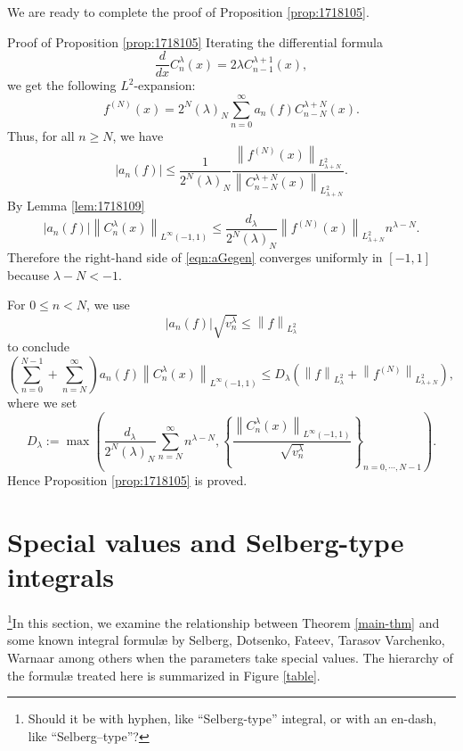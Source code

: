 \documentclass[12pt]{article}
\newcommand{\myabs}[1]{\left|#1\right|}
\numberwithin{equation}{section}
\newcommand{\mynorm}[1]{\left\|#1\right\|}
\newenvironment{proof*}[1]{\noindent{\textit{#1.\ }}}{\hspace*{\fill}$\Box$\medskip}
\newcommand{\mygrammarfootnote}[1]{}
\begin{document}
We are ready to complete the proof of Proposition \ref{prop:1718105}.

\begin{proof*}{Proof of Proposition \ref{prop:1718105}}
	Iterating the differential formula\begin{equation*}
		\frac{d}{dx}C_n^\lambda(x)=2\lambda C^{\lambda+1}_{n-1}(x),
	\end{equation*}we {get} the following $L^2$-expansion:\begin{equation*}
		f^{(N)}(x)=2^N(\lambda)_N\displaystyle\sum_{n=0}^\infty a_n(f)C_{n-N}^{\lambda+N}(x).
	\end{equation*}Thus, for all $n\ge N$, we have\begin{equation*}
		\myabs{a_n(f)}\le\frac{1}{2^N(\lambda)_N}\frac{\mynorm{f^{(N)}(x)}_{L^2_{\lambda+N}}}{\mynorm{C^{\lambda+N}_{n-N}(x)}_{L^2_{\lambda+N}}}.
	\end{equation*}By Lemma \ref{lem:1718109}\begin{equation*}
		\myabs{a_n(f)}\mynorm{C^\lambda_n(x)}_{L^\infty(-1,1)}\le\frac{d_\lambda}{2^N(\lambda)_N}\mynorm{f^{(N)}(x)}_{L^2_{\lambda+N}}n^{\lambda-N}.
	\end{equation*}Therefore\mygrammarfootnote{comma here?} the right-hand side of \eqref{eqn:aGegen} converges uniformly in $[-1,1]$ because $\lambda-N<-1$.

	For $0\le n<N$, we use\begin{equation*}
		\myabs{a_n(f)}\sqrt{v_n^\lambda}\le\mynorm{f}_{L_\lambda^2}
	\end{equation*}to conclude\begin{equation*}
		\left(\sum_{n=0}^{N-1}+\sum_{n=N}^\infty  \right) a_n(f)\mynorm{C_n^\lambda(x)}_{L^\infty(-1,1)}\le D_\lambda\left( \mynorm{f}_{L^2_\lambda}+\mynorm{f^{(N)}}_{L^2_{\lambda+N}} \right),
	\end{equation*}where we set\begin{equation*}
		D_\lambda:=\max\left( \frac{d_\lambda}{2^N(\lambda)_N}\displaystyle\sum_{n=N}^{\infty}n^{\lambda-N},\left\{ \frac{\mynorm{C_n^\lambda(x)}_{L^\infty(-1,1)}}{\sqrt{v_n^\lambda}} \right\}_{n=0,\cdots,N-1} \right).
	\end{equation*}Hence Proposition \ref{prop:1718105} is proved.
\end{proof*}

\section{{{Special values and Selberg-type integrals}}}\label{sec:4}
\footnote{Should it be with hyphen, like ``Selberg-type'' integral, or with an en-dash, like ``Selberg--type''?}In this section, we examine the relationship between Theorem
\ref{main-thm} and some known integral formul{\ae} by Selberg, Dotsenko,
Fateev, Tarasov Varchenko, Warnaar among others when the parameters take
special values. The hierarchy of the formul{\ae} treated here is summarized in
Figure \ref{table}.
\end{document}
